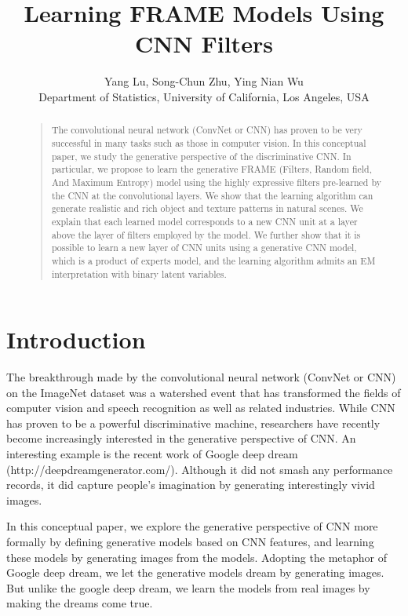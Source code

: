 \documentclass[letterpaper]{article}
\begin{document}
%
\title{Learning FRAME Models Using CNN Filters}
\author{Yang Lu, Song-Chun Zhu, Ying Nian Wu\\
	Department of Statistics, University of California, Los Angeles, USA
}
\maketitle
\begin{abstract}
\begin{quote}
The convolutional neural network (ConvNet or CNN) has proven to be very successful in many tasks such as those  in computer vision. In this conceptual paper, we study the generative perspective of the discriminative CNN. In particular, we propose to learn the generative FRAME (Filters, Random field, And Maximum Entropy) model using the highly expressive filters pre-learned by the CNN at the convolutional layers. We show that the learning algorithm can generate  realistic and rich object and texture patterns in natural scenes. We explain that each learned model corresponds to a new CNN unit at a layer above the layer of filters employed by the model. We further show that it is possible to learn a new layer of CNN units using a generative CNN model, which is a product of experts model, and the learning algorithm admits an EM interpretation with binary latent variables. 
\end{quote}
\end{abstract}

\section{Introduction}

The breakthrough made by the convolutional neural network (ConvNet or CNN)  \citep{krizhevsky2012imagenet, lecun1998gradient} on the ImageNet dataset \citep{deng2009imagenet} was a watershed event that has transformed the fields of computer vision and speech recognition as well as related industries. While CNN has proven to be a powerful discriminative machine, researchers have recently become increasingly interested in the generative perspective of CNN. An interesting example is the recent work of Google deep dream (http://deepdreamgenerator.com/). Although it did not smash any performance records, it did capture people's imagination by generating interestingly vivid images. 

In this conceptual paper, we explore the generative perspective of CNN more formally by defining generative models based on CNN features, and learning these models by generating images  from the models. Adopting the metaphor of Google deep dream, we let the generative models dream by generating images. But unlike the google deep dream, we learn the models from real images by making the dreams come true. 
\end{document}
